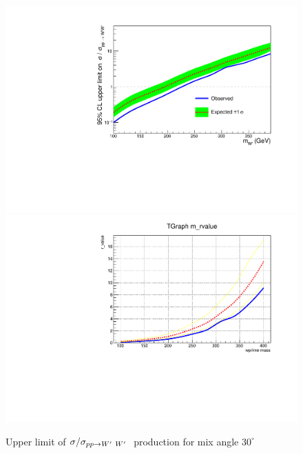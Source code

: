 

 
\begin{figure}[!ht]
\centering
\includegraphics*[width=.45\textwidth]{figs/mix30b.pdf}
\hspace{3mm}
\includegraphics*[width=.45\textwidth]{figs/mix30.pdf}
\caption{Upper limit of $\sigma/\sigma_{pp \rightarrow W^\prime~ W^\prime~}$ production for mix angle $30^\circ$ }
\label{fig:mix30}
\end{figure}

